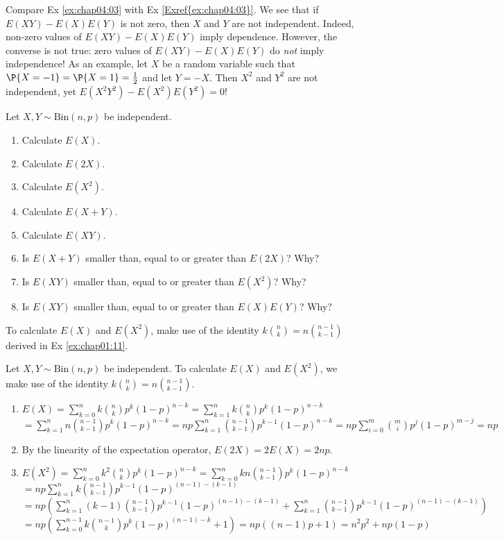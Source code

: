 \begin{remark}
	Compare Ex \ref{ex:chap04:03} with Ex \ref{Exref{ex:chap04:03}}. We see that if $E(XY) - E(X)E(Y)$ is not zero, then $X$ and $Y$ are not independent. Indeed, non-zero values of $E(XY) - E(X)E(Y)$ imply dependence. However, the converse is not true: zero values of $E(XY) - E(X)E(Y)$ do \emph{not} imply independence! As an example, let $X$ be a random variable such that $\P{X = -1} = \P{X = 1} = \frac{1}{2}$ and let $Y = -X$. Then $X^2$ and $Y^2$ are not independent, yet $E(X^2Y^2) -E(X^2) E(Y^2) = 0$!    
\end{remark}

\begin{exercise}\label{ex:chap04:01}
	Let $X, Y \sim \text{Bin}(n,p)$ be independent.
	\begin{enumerate}
		\item Calculate $E(X)$.
		\item Calculate $E(2X)$.
		\item Calculate $E(X^2)$.
		\item Calculate $E(X+Y)$. 
		\item Calculate $E(XY)$.
		\item Is $E(X+Y)$ smaller than, equal to or greater than $E(2X)$? Why?
		\item Is $E(XY)$ smaller than, equal to or greater than $E(X^2)$? Why?
		\item Is $E(XY)$ smaller than, equal to or greater than $E(X)E(Y)$? Why?
	\end{enumerate}
	\begin{hint}
		To calculate $E(X)$ and $E(X^2)$, make use of the identity $k \binom{n}{k} = n \binom{n - 1}{k - 1}$ derived in Ex \ref{ex:chap01:11}.
	\end{hint}
	\begin{solution}
	Let $X, Y \sim \text{Bin}(n,p)$ be independent. To calculate $E(X)$ and $E(X^2)$, we make use of the identity $k \binom{n}{k} = n \binom{n - 1}{k - 1}$.
	\begin{enumerate}
		\item $E(X) = \sum_{k = 0}^n k \binom{n}{k} p^k (1 - p)^{n - k} = \sum_{k = 1}^n k \binom{n}{k} p^k (1 - p)^{n - k} $\\$= \sum_{k = 1}^n n \binom{n - 1}{k - 1} p^k (1 - p)^{n - k} = np \sum_{k = 1}^n \binom{n - 1}{k - 1} p^{k - 1} (1 - p)^{n - k} = np \sum_{i = 0}^m \binom{m}{i} p^j (1 - p)^{m - j} = np$
		\item By the linearity of the expectation operator, $E(2X) = 2E(X) = 2np$.
		\item $E(X^2) = \sum_{k = 0}^n k^2 \binom{n}{k} p^k (1 - p)^{n - k} = \sum_{k = 0}^n kn \binom{n - 1}{k - 1} p^k (1 - p)^{n - k}$\\$ = np \sum_{k = 1}^n k \binom{n - 1}{k - 1} p^{k - 1} (1 - p)^{(n - 1) - (k - 1)}$\\$ = np \left(\sum_{k = 1}^n (k - 1) \binom{n - 1}{k - 1} p^{k - 1} (1 - p)^{(n - 1) - (k - 1)} + \sum_{k = 1}^n \binom{n - 1}{k - 1} p^{k - 1} (1 - p)^{(n - 1) - (k - 1)}\right)$\\$ = np \left(\sum_{k = 0}^{n - 1} k \binom{n - 1}{k} p^{k} (1 - p)^{(n - 1) - k} + 1\right) = np((n - 1)p + 1) = n^2 p^2 + np(1 - p)$

\end{enumerate}
\end{solution}
\end{exercise}
